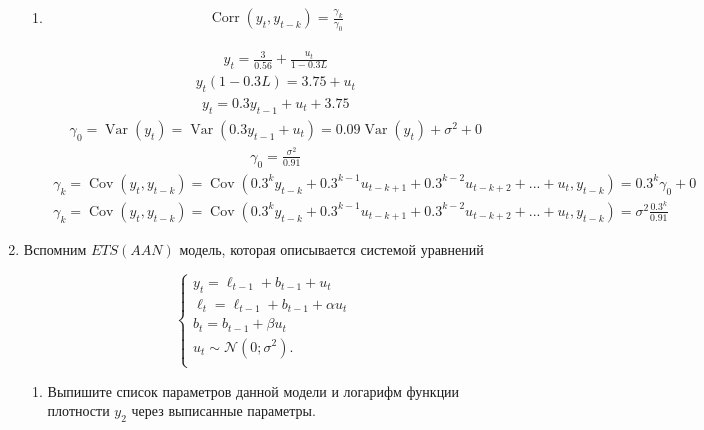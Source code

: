 \documentclass[a4paper,14pt]{article}
\DeclareMathOperator{\Cov}{Cov}
\DeclareMathOperator{\Corr}{Corr}
\DeclareMathOperator{\Var}{Var}
\def \s{\sigma}
\def \cN{\mathcal{N}}
\begin{document}
\begin{enumerate}
\begin{enumerate}
	\item 

          \[\begin{aligned}
\Corr(y_{t}, y_{t-k}) = \frac{\gamma_k}{\gamma_0} 
	\end{aligned}\]

        \[\begin{aligned}
y_t = \frac{3}{0.56} + \frac{u_t}{1-0.3L} 
	\end{aligned}\]
         \[\begin{aligned}
y_t(1-0.3L) = 3.75 + u_t
	\end{aligned}\]
          \[\begin{aligned}
y_t = 0.3y_{t-1} + u_t + 3.75
	\end{aligned}\]
           \[\begin{aligned}
\gamma_0 = \Var(y_t) = \Var(0.3y_{t-1} + u_t) = 0.09\Var(y_t) + \s^2 + 0
	\end{aligned}\]
           \[\begin{aligned}
\gamma_0 = \frac{\s^2}{0.91}
	\end{aligned}\]
            \[\begin{aligned}
\gamma_k = \Cov(y_t, y_{t-k}) = \Cov(0.3^ky_{t-k} + 0.3^{k-1}u_{t-k+1} + 0.3^{k-2}u_{t-k+2} + ... +u_t , y_{t-k})  = 0.3^k\gamma_0 + 0
	\end{aligned}\]
            \[\begin{aligned}
\gamma_k = \Cov(y_t, y_{t-k}) = \Cov(0.3^ky_{t-k} + 0.3^{k-1}u_{t-k+1} + 0.3^{k-2}u_{t-k+2} + ... +u_t , y_{t-k})  = \s^2\frac{0.3^k}{0.91}
	\end{aligned}\]
 
\end{enumerate}



\item Вспомним $ETS(AAN)$ модель, которая описывается системой уравнений

\[
\begin{cases}
y_t = \ell_{t-1} + b_{t-1} + u_t \\
\ell_t = \ell_{t-1} + b_{t-1} + \alpha u_t \\
b_t = b_{t-1} + \beta u_t \\
u_t \sim \cN(0;\sigma^2). \\
\end{cases}
\]

\begin{enumerate}
	\item Выпишите список параметров данной модели и логарифм функции плотности $y_2$ через выписанные параметры. 
	

\end{enumerate}
\end{enumerate}
\end{document}
